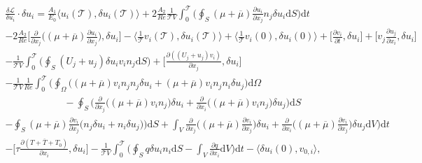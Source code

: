 \documentclass[preprint,12pt]{article}
\begin{document}
\begin{align}\begin{split}
&\frac{\delta \mathcal{L}}{\delta u_i}\cdot \delta u_i=\frac{A_1}{E_0}\Big\langle u_i(\mathcal{T}),\delta u_i(\mathcal{T}) \Big\rangle+2\frac{A_2}{Re}\frac{1}{\mathcal{T}V}\int_0^\mathcal{T}\Big(\oint_S(\mu+\overline{\mu})\frac{\partial u_i}{\partial x_j}  n_j\delta u_i\text{d}S\Big)\text{d}t\\&-2\frac{A_2}{Re}\bigg[\frac{\partial}{\partial x_j}\Big((\mu+\overline{\mu})\frac{\partial u_i}{\partial x_j}\Big),\delta u_i\bigg]-\Big\langle \frac{1}{\mathcal{\mathcal{T}}}v_i(\mathcal{T}),\delta u_i(\mathcal{T})\Big\rangle+\Big\langle \frac{1}{\mathcal{\mathcal{T}}}v_i(0),\delta u_i(0)\Big\rangle+\Bigg[\frac{\partial v_i}{\partial t},\delta u_i\Bigg]+\Bigg[v_j\frac{\partial u_j}{\partial x_i},\delta u_i\Bigg]\\&-\frac{1}{\mathcal{T}V}\int_0^\mathcal{T}\Big(\oint_S(U_j+u_j)\delta u_i v_in_j \text{d}S\Big)+\Bigg[\frac{\partial ((U_j+u_j)v_i)}{\partial x_j},\delta u_i\Bigg]\\&-\frac{1}{\mathcal{T}V}\frac{1}{Re}\int_0^\mathcal{T}\Bigg(\oint_\Omega\Big(({\mu}+\overline{\mu})v_in_jn_j\delta u_i+({\mu}+\overline{\mu})v_in_jn_i\delta u_j\Big) \text{d}\Omega\\&\hspace{1in}-\oint_S\Big(\frac{\partial}{\partial x_j}\Big(({\mu}+\overline{\mu})v_in_j\Big)\delta u_i+\frac{\partial}{\partial x_i}\Big(({\mu}+\overline{\mu})v_in_j\Big)\delta u_j\Big) \text{d}S\\&-\oint_S({\mu}+\overline{\mu})\frac{\partial v_i}{\partial x_j}\Big(n_j\delta u_i+n_i\delta u_j \Big)\Big)\text{d}S+\int_V\frac{\partial}{\partial x_j}\Big(({\mu}+\overline{\mu})\frac{\partial v_i}{\partial x_j}\Big)\delta u_i+\frac{\partial}{\partial x_i}\Big(({\mu}+\overline{\mu})\frac{\partial v_i}{\partial x_j}\Big)\delta u_j \text{d}V\Bigg)\text{d}t\\&-\Bigg[\tau\frac{\partial (T+\overline{T}+T_0)}{\partial x_i},\delta u_i\Bigg]
-\frac{1}{\mathcal{T}V}\int_0^\mathcal{T}\Bigg(\oint_Sq\delta u_in_i\text{d}S-\int_V\frac{\partial q}{\partial x_i}\text{d}V\Bigg)\text{d}t-\langle \delta u_i(0),v_{0,i}\rangle,
\end{split}\end{align}
\end{document}
